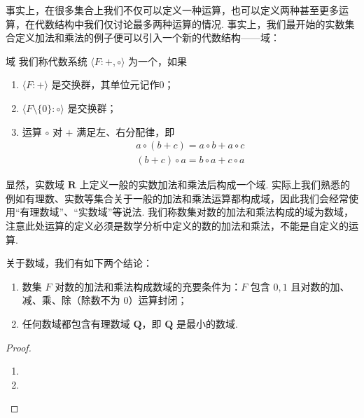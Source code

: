 事实上，在很多集合上我们不仅可以定义一种运算，也可以定义两种甚至更多运算，在代数结构中我们仅讨论最多两种运算的情况. 事实上，我们最开始的实数集合定义加法和乘法的例子便可以引入一个新的代数结构——域：
\begin{definition}{域}{} 
    我们称代数系统 $\langle F\colon+,\circ\rangle$ 为一个，如果
    \begin{enumerate}
        \item $\langle F\colon+\rangle$ 是交换群，其单位元记作0；

        \item $\langle F\setminus\{0\}\colon\circ\rangle$ 是交换群；

        \item 运算 $\circ$ 对 $+$ 满足左、右分配律，即
              \begin{gather*}
                  a \circ (b + c) = a \circ b + a \circ c \\
                  (b + c) \circ a = b \circ a + c \circ a
              \end{gather*}
    \end{enumerate}
\end{definition}

显然，实数域 $\mathbf{R}$ 上定义一般的实数加法和乘法后构成一个域. 实际上我们熟悉的例如有理数、实数等集合关于一般的加法和乘法运算都构成域，因此我们会经常使用``有理数域''、``实数域''等说法. 我们称数集对数的加法和乘法构成的域为数域，注意此处运算的定义必须是数学分析中定义的数的加法和乘法，不能是自定义的运算.

\begin{theorem}{}{}
    关于数域，我们有如下两个结论：
    \begin{enumerate}
        \item 数集 $F$ 对数的加法和乘法构成数域的充要条件为：$F$ 包含 $0,1$ 且对数的加、减、乘、除（除数不为 $0$）运算封闭；

        \item 任何数域都包含有理数域 $\mathbf{Q}$，即 $\mathbf{Q}$ 是最小的数域.
    \end{enumerate}
\end{theorem}

\begin{proof}
\begin{enumerate}
    \item
    \item
\end{enumerate}
\end{proof}

